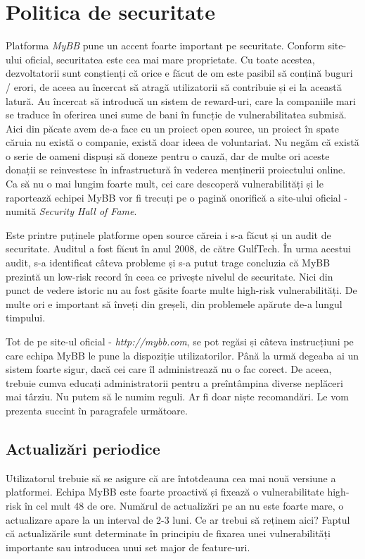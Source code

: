 \chapter{Politica de securitate}

Platforma \textit{MyBB} pune un accent foarte important pe securitate. Conform site-ului oficial, securitatea este cea mai mare proprietate. Cu toate acestea, dezvoltatorii sunt conștienți că orice e făcut de om este pasibil să conțină buguri / erori, de aceea au încercat să atragă utilizatorii să contribuie și ei la această latură. Au încercat să introducă un sistem de reward-uri, care la companiile mari se traduce în oferirea unei sume de bani în funcție de vulnerabilitatea submisă. Aici din păcate avem de-a face cu un proiect open source, un proiect în spate căruia nu există o companie, există doar ideea de voluntariat. Nu negăm că există o serie de oameni dispuși să doneze pentru o cauză, dar de multe ori aceste donații se reinvestesc în infrastructură în vederea menținerii proiectului online. Ca să nu o mai lungim foarte mult, cei care descoperă vulnerabilități și le raportează echipei MyBB vor fi trecuți pe o pagină onorifică a site-ului oficial - numită \textit{Security Hall of Fame}.

Este printre puținele platforme open source căreia i s-a făcut și un audit de securitate. Auditul a fost făcut în anul 2008, de către GulfTech. În urma acestui audit, s-a identificat câteva probleme și s-a putut trage concluzia că MyBB prezintă un low-risk record în ceea ce privește nivelul de securitate. Nici din punct de vedere istoric nu au fost găsite foarte multe high-risk vulnerabilități. De multe ori e important să înveți din greșeli, din problemele apărute de-a lungul timpului.

Tot de pe site-ul oficial - \textit{http://mybb.com}, se pot regăsi și câteva instrucțiuni pe care echipa MyBB le pune la dispoziție utilizatorilor. Până la urmă degeaba ai un sistem foarte sigur, dacă cei care îl administrează nu o fac corect. De aceea, trebuie cumva educați administratorii pentru a preîntâmpina diverse neplăceri mai târziu. Nu putem să le numim reguli. Ar fi doar niște recomandări. Le vom prezenta succint în paragrafele următoare.

\section{Actualizări periodice}

Utilizatorul trebuie să se asigure că are întotdeauna cea mai nouă versiune a platformei. Echipa MyBB este foarte proactivă și fixează o vulnerabilitate high-risk în cel mult 48 de ore. Numărul de actualizări pe an nu este foarte mare, o actualizare apare la un interval de 2-3 luni. Ce ar trebui să reținem aici? Faptul că actualizările sunt determinate în principiu de fixarea unei vulnerabilități importante sau introducea unui set major de feature-uri.

